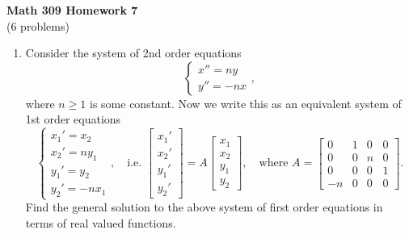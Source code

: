 \documentclass[11pt]{article}
\theoremstyle{definition}
\begin{document}
\begin{center}
\textbf{Math 309 Homework 7}\\
(6 problems)
\end{center}



\begin{enumerate}[leftmargin=*]
\item 
Consider the system of 2nd order equations
$$
\begin{cases}
x''=ny\\
y''=-nx
\end{cases},
$$
where $n\geq 1$ is some constant.  Now we write this as an equivalent system of 1st order equations
$$
\begin{cases}
x_1'=x_2\\
x_2'=ny_1\\
y_1'=y_2\\
y_2'=-nx_1
\end{cases}, \quad \text{i.e. } 
\begin{bmatrix}x_1' \\ x_2' \\y_1'\\y_2' \end{bmatrix} 
= A\begin{bmatrix}x_1\\x_2\\y_1\\y_2\end{bmatrix}, \quad \text{where } 
A=\begin{bmatrix}0 &1&0&0\\
0&0&n&0\\
0&0&0&1\\
-n&0&0&0
\end{bmatrix}.
$$
Find the general solution to the above system of first order equations in terms of real valued functions.\\


\end{enumerate}
\end{document}
